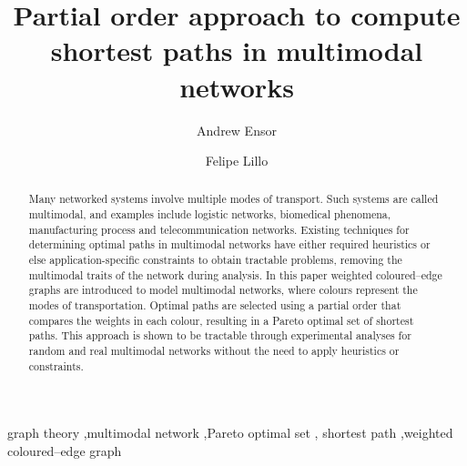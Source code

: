 \documentclass[preprint,authoryear,12pt]{elsarticle}
\begin{document}
\begin{frontmatter}

\title{Partial order approach to compute shortest paths in  multimodal networks}
\author{Andrew Ensor}
\author{Felipe Lillo}


\address{School of Computing and Mathematical Sciences,
Auckland University of Technology,
2-14 Wakefield St, Auckland 1142, New Zealand.}


\begin{abstract}
Many networked systems involve multiple modes of transport. Such
systems are called multimodal, and examples include logistic
networks, biomedical phenomena, manufacturing process and
telecommunication networks.
Existing techniques for determining optimal paths in
multimodal networks have either required
heuristics or else application-specific constraints to obtain
tractable problems, removing the multimodal traits of the network during analysis.
In this paper weighted coloured--edge graphs are introduced to
model multimodal networks, where colours represent the modes of
transportation.
Optimal paths are selected using a partial order that compares the
weights in each colour, resulting in a Pareto optimal set of shortest paths.
This approach is shown to be tractable through experimental
analyses for random and real multimodal networks without the need
to apply heuristics or constraints.
\end{abstract}

\begin{keyword}
graph theory \sep multimodal network \sep Pareto optimal set \sep
shortest path \sep weighted coloured--edge graph







\end{keyword}

\end{frontmatter}

\newcommand{\bin}[2]{
                      \left(
                            \begin{array}{@{}c@{}}
                                #1 \\ #2
                            \end{array}
                      \right)                   }
\end{document}
